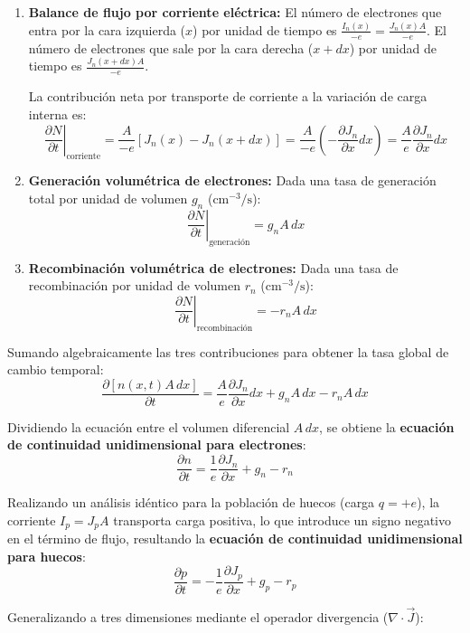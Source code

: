 \begin{enumerate}
    \item \textbf{Balance de flujo por corriente eléctrica:}
    El número de electrones que entra por la cara izquierda ($x$) por unidad de tiempo es $\frac{I_n(x)}{-e} = \frac{J_n(x) A}{-e}$. 
    El número de electrones que sale por la cara derecha ($x+dx$) por unidad de tiempo es $\frac{J_n(x+dx) A}{-e}$.
    
    La contribución neta por transporte de corriente a la variación de carga interna es:
    \[
    \left. \frac{\partial N}{\partial t} \right|_{\text{corriente}} = \frac{A}{-e} \left[ J_n(x) - J_n(x+dx) \right] = \frac{A}{-e} \left( -\frac{\partial J_n}{\partial x} dx \right) = \frac{A}{e} \frac{\partial J_n}{\partial x} dx
    \]

    \item \textbf{Generación volumétrica de electrones:}
    Dada una tasa de generación total por unidad de volumen $g_n$ ($\si{\cm^{-3}\per\second}$):
    \[
    \left. \frac{\partial N}{\partial t} \right|_{\text{generación}} = g_n A \, dx
    \]

    \item \textbf{Recombinación volumétrica de electrones:}
    Dada una tasa de recombinación por unidad de volumen $r_n$ ($\si{\cm^{-3}\per\second}$):
    \[
    \left. \frac{\partial N}{\partial t} \right|_{\text{recombinación}} = -r_n A \, dx
    \]
\end{enumerate}

Sumando algebraicamente las tres contribuciones para obtener la tasa global de cambio temporal:
\[
\frac{\partial [n(x,t) A \, dx]}{\partial t} = \frac{A}{e} \frac{\partial J_n}{\partial x} dx + g_n A \, dx - r_n A \, dx
\]

Dividiendo la ecuación entre el volumen diferencial $A \, dx$, se obtiene la \textbf{ecuación de continuidad unidimensional para electrones}:
\[
\frac{\partial n}{\partial t} = \frac{1}{e} \frac{\partial J_n}{\partial x} + g_n - r_n
\]

Realizando un análisis idéntico para la población de huecos (carga $q = +e$), la corriente $I_p = J_p A$ transporta carga positiva, lo que introduce un signo negativo en el término de flujo, resultando la \textbf{ecuación de continuidad unidimensional para huecos}:
\[
\frac{\partial p}{\partial t} = -\frac{1}{e} \frac{\partial J_p}{\partial x} + g_p - r_p
\]

Generalizando a tres dimensiones mediante el operador divergencia ($\nabla \cdot \vec{J}$):

